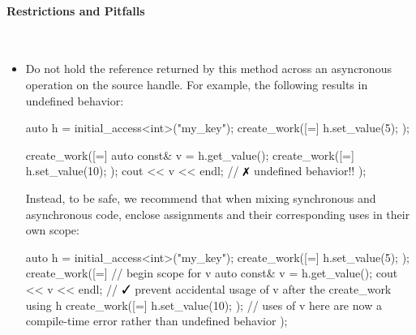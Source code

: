 \paragraph{Restrictions and Pitfalls}\mbox{}\\ 
\begin{itemize}
  \item Do not hold the reference returned by this method across an asyncronous
  operation on the source handle.  For example, the following results in
  undefined behavior:
  \begin{CppCode}
	auto h = initial_access<int>("my_key"); 
	create_work([=]{ h.set_value(5); });
	
	create_work([=]{ 
	  auto const& v = h.get_value();
	  create_work([=]{ h.set_value(10); });
	  cout << v << endl; // $\no$ undefined behavior!!
	});
  \end{CppCode}
  Instead, to be safe, we recommend that when mixing synchronous and
  asynchronous code, enclose assignments and their corresponding uses in their
  own scope:
  \begin{CppCode}
	auto h = initial_access<int>("my_key"); 
	create_work([=]{ h.set_value(5); });
	create_work([=]{ 
	  { // begin scope for v
		auto const& v = h.get_value();
		cout << v << endl; 
	  } // $\yes$ prevent accidental usage of v after the create_work using h
	  create_work([=]{ h.set_value(10); });
	  // uses of v here are now a compile-time error rather than undefined behavior
	});
  \end{CppCode}
\end{itemize}